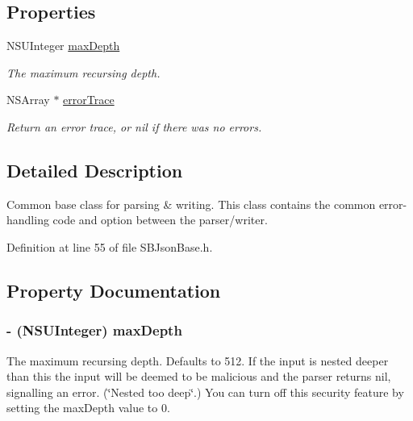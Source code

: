 \subsection*{Properties}
\begin{DoxyCompactItemize}
\item 
NSUInteger \hyperlink{interface_s_b_json_base_abe3e47517711570a9a57e2d92a15055b}{maxDepth}
\begin{DoxyCompactList}\small\item\em The maximum recursing depth. \item\end{DoxyCompactList}\item 
NSArray $\ast$ \hyperlink{interface_s_b_json_base_aa83f0ee5efade2fd26ddf6591ffd8dc0}{errorTrace}
\begin{DoxyCompactList}\small\item\em Return an error trace, or nil if there was no errors. \item\end{DoxyCompactList}\end{DoxyCompactItemize}


\subsection{Detailed Description}
Common base class for parsing \& writing. This class contains the common error-\/handling code and option between the parser/writer. 

Definition at line 55 of file SBJsonBase.h.

\subsection{Property Documentation}
\hypertarget{interface_s_b_json_base_abe3e47517711570a9a57e2d92a15055b}{
\subsubsection[{maxDepth}]{\setlength{\rightskip}{0pt plus 5cm}-\/ (NSUInteger) maxDepth}}
\label{interface_s_b_json_base_abe3e47517711570a9a57e2d92a15055b}


The maximum recursing depth. Defaults to 512. If the input is nested deeper than this the input will be deemed to be malicious and the parser returns nil, signalling an error. (\char`\"{}Nested too deep\char`\"{}.) You can turn off this security feature by setting the maxDepth value to 0. 

